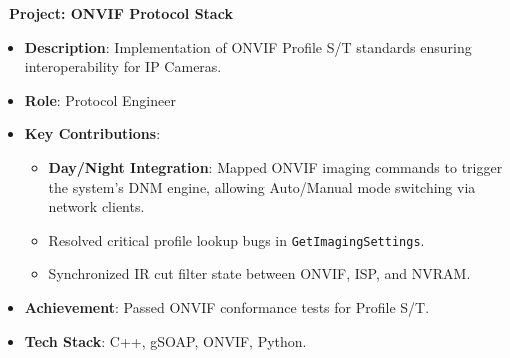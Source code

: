 \documentclass[letterpaper,10pt]{article}
\newenvironment{resume_list}{
  \vspace{-7pt}
  \begin{itemize}[itemsep=-2px, parsep=1pt, leftmargin=30pt]
}{
  \end{itemize}
}
\begin{document}
\begin{resume_list}
     \item \textbf{\faNetworkWired\ Project: ONVIF Protocol Stack}
       \begin{itemize}[itemsep=1pt, leftmargin=15pt, label=-]
         \item \textbf{Description}: Implementation of ONVIF Profile S/T standards ensuring interoperability for IP Cameras.
         \item \textbf{Role}: Protocol Engineer
         \item \textbf{Key Contributions}:
           \begin{itemize}[itemsep=0pt, leftmargin=10pt, label=$\circ$]
              \item \textbf{Day/Night Integration}: Mapped ONVIF imaging commands to trigger the system's DNM engine, allowing Auto/Manual mode switching via network clients.
              \item Resolved critical profile lookup bugs in \texttt{GetImagingSettings}.
              \item Synchronized IR cut filter state between ONVIF, ISP, and NVRAM.
           \end{itemize}
         \item \textbf{Achievement}: Passed ONVIF conformance tests for Profile S/T.
         \item \textbf{Tech Stack}: C++, gSOAP, ONVIF, Python.
       \end{itemize}

 


\end{resume_list}
\end{document}

